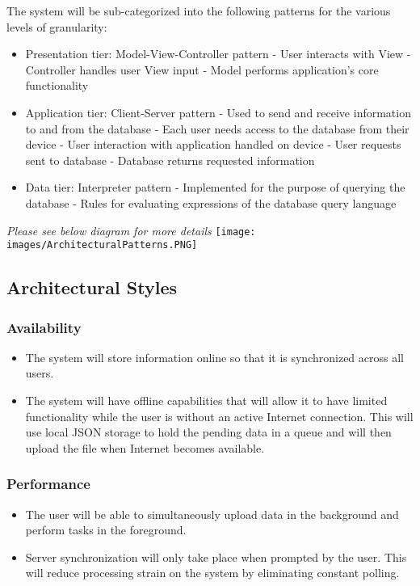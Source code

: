 \documentclass[11pt]{article}
\begin{document}
The system will be sub-categorized into the following patterns for the various levels of granularity:
\begin{itemize}
    \item Presentation tier: Model-View-Controller pattern
        \subitem - User interacts with View
        \subitem - Controller handles user View input
        \subitem - Model performs application's core functionality
    \item Application tier: Client-Server pattern
        \subitem - Used to send and receive information to and from the database
        \subitem - Each user needs access to the database from their device
        \subitem - User interaction with application handled on device
        \subitem - User requests sent to database
        \subitem - Database returns requested information
    \item Data tier: Interpreter pattern
        \subitem - Implemented for the purpose of querying the database
        \subitem - Rules for evaluating expressions of the database query language
\end{itemize}
\textit{Please see below diagram for more details}
\newpage
\texttt{[image: images/ArchitecturalPatterns.PNG]}
\newpage
\subsection{Architectural Styles}
    \subsubsection{Availability}
    \begin{itemize}
        \item The system will store information online so that it is synchronized across all users.
        \item The system will have offline capabilities that will allow it to have limited functionality while the user is without an active Internet connection. This will use local JSON storage to hold the pending data in a queue and will then upload the file when Internet becomes available.
    \end{itemize}
    \subsubsection{Performance}
    \begin{itemize}
        \item The user will be able to simultaneously upload data in the background and perform tasks in the foreground.
        \item Server synchronization will only take place when prompted by the user. This will reduce processing strain on the system by eliminating constant polling.
    \end{itemize}
\end{document}
